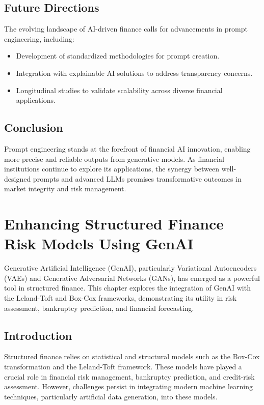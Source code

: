 \documentclass[a4paper,headinclude=on,footinclude=on,12pt,oneside]{scrbook}
\begin{document}
\section{Future Directions}
The evolving landscape of AI-driven finance calls for advancements in prompt engineering, including:
\begin{itemize}
	\item Development of standardized methodologies for prompt creation.
	\item Integration with explainable AI solutions to address transparency concerns.
	\item Longitudinal studies to validate scalability across diverse financial applications.
\end{itemize}

\section{Conclusion}
Prompt engineering stands at the forefront of financial AI innovation, enabling more precise and reliable outputs from generative models. As financial institutions continue to explore its applications, the synergy between well-designed prompts and advanced LLMs promises transformative outcomes in market integrity and risk management.



\chapter{Enhancing Structured Finance Risk Models Using GenAI}

Generative Artificial Intelligence (GenAI), particularly Variational Autoencoders (VAEs) and Generative Adversarial Networks (GANs), has emerged as a powerful tool in structured finance. This chapter explores the integration of GenAI with the Leland-Toft and Box-Cox frameworks, demonstrating its utility in risk assessment, bankruptcy prediction, and financial forecasting.

\section{Introduction}
Structured finance relies on statistical and structural models such as the Box-Cox transformation and the Leland-Toft framework. These models have played a crucial role in financial risk management, bankruptcy prediction, and credit-risk assessment. However, challenges persist in integrating modern machine learning techniques, particularly artificial data generation, into these models. 
\end{document}
